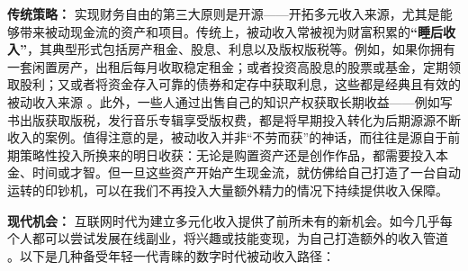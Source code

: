 \documentclass[
  12pt]{article}
\begin{document}
\textbf{传统策略：}
实现财务自由的第三大原则是开源------开拓多元收入来源，尤其是能够带来被动现金流的资产和项目。传统上，被动收入常被视为财富积累的\textbf{``睡后收入''}，其典型形式包括房产租金、股息、利息以及版权版税等。例如，如果你拥有一套闲置房产，出租后每月收取稳定租金；或者投资高股息的股票或基金，定期领取股利；又或者将资金存入可靠的债券和定存中获取利息，这些都是经典且有效的被动收入来源
\cite{ref6}。此外，一些人通过出售自己的知识产权获取长期收益------例如写书出版获取版税，发行音乐专辑享受版权费，都是将早期投入转化为后期源源不断收入的案例。值得注意的是，被动收入并非``不劳而获''的神话，而往往是源自于前期策略性投入所换来的明日收获：无论是购置资产还是创作作品，都需要投入本金、时间或才智。但一旦这些资产开始产生现金流，就仿佛给自己打造了一台自动运转的印钞机，可以在我们不再投入大量额外精力的情况下持续提供收入保障。

\textbf{现代机会：}
互联网时代为建立多元化收入提供了前所未有的新机会。如今几乎每个人都可以尝试发展在线副业，将兴趣或技能变现，为自己打造额外的收入管道
\cite{ref2}。以下是几种备受年轻一代青睐的数字时代被动收入路径：
\end{document}
